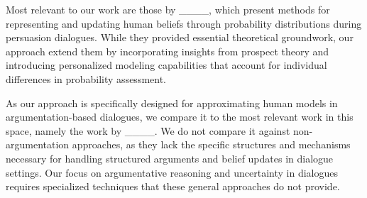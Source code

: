  

Most relevant to our work are those by ____, which present methods for representing and updating human beliefs through probability distributions during persuasion dialogues. While they provided essential theoretical groundwork, our approach extend them by incorporating insights from prospect theory and introducing personalized modeling capabilities that account for individual differences in probability assessment.
 

As our approach is specifically designed for approximating human models in argumentation-based dialogues, we compare it to the most relevant work in this space, namely the work by ____. We do not compare it against non-argumentation approaches, as they lack the specific structures and mechanisms necessary for handling structured arguments and belief updates in dialogue settings. Our focus on argumentative reasoning and uncertainty in dialogues requires specialized techniques that these general approaches do not provide.
